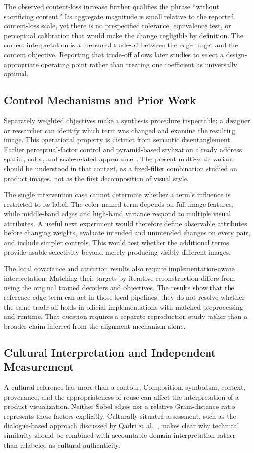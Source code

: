 \documentclass[manuscript,acmlarge,screen,review]{acmart}
\begin{document}
The observed content-loss increase further qualifies the phrase ``without sacrificing content.'' Its aggregate magnitude is small relative to the reported content-loss scale, yet there is no prespecified tolerance, equivalence test, or perceptual calibration that would make the change negligible by definition. The correct interpretation is a measured trade-off between the edge target and the content objective. Reporting that trade-off allows later studies to select a design-appropriate operating point rather than treating one coefficient as universally optimal.

\subsection{Control Mechanisms and Prior Work}
Separately weighted objectives make a synthesis procedure inspectable: a designer or researcher can identify which term was changed and examine the resulting image. This operational property is distinct from semantic disentanglement. Earlier perceptual-factor control and pyramid-based stylization already address spatial, color, and scale-related appearance~\cite{gatys2017control,lapstyle2021}. The present multi-scale variant should be understood in that context, as a fixed-filter combination studied on product images, not as the first decomposition of visual style.

The single intervention case cannot determine whether a term's influence is restricted to its label. The color-named term depends on full-image features, while middle-band edges and high-band variance respond to multiple visual attributes. A useful next experiment would therefore define observable attributes before changing weights, evaluate intended and unintended changes on every pair, and include simpler controls. This would test whether the additional terms provide usable selectivity beyond merely producing visibly different images.

The local covariance and attention results also require implementation-aware interpretation. Matching their targets by iterative reconstruction differs from using the original trained decoders and objectives. The results show that the reference-edge term can act in those local pipelines; they do not resolve whether the same trade-off holds in official implementations with matched preprocessing and runtime. That question requires a separate reproduction study rather than a broader claim inferred from the alignment mechanism alone.

\subsection{Cultural Interpretation and Independent Measurement}
A cultural reference has more than a contour. Composition, symbolism, context, provenance, and the appropriateness of reuse can affect the interpretation of a product visualization. Neither Sobel edges nor a relative Gram-distance ratio represents these factors explicitly. Culturally situated assessment, such as the dialogue-based approach discussed by Qadri et al.~\cite{qadri2024}, makes clear why technical similarity should be combined with accountable domain interpretation rather than relabeled as cultural authenticity.
\end{document}

